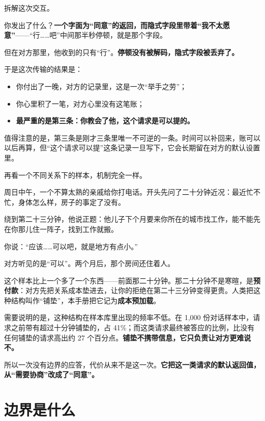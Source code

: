 拆解这次交互。

你发出了什么？\textbf{一个字面为“同意”的返回，而隐式字段里带着“我不太愿意”}——“行……吧”中间那半秒停顿，就是那个字段。

但在对方那里，他收到的只有“行”。\textbf{停顿没有被解码，隐式字段被丢弃了。}

于是这次传输的结果是：

\begin{itemize}
\item 你付出了一晚，对方的记录里，这是一次“举手之劳”；
\item 你心里积了一笔，对方心里没有这笔账；
\item \textbf{最严重的是第三条：你教会了他，这个请求是可以提的。}
\end{itemize}

值得注意的是，第三条是刚才三条里唯一不可逆的一条。时间可以补回来，账可以以后再算，但“这个请求可以提”这条记录一旦写下，它会长期留在对方的默认设置里。

再看一个不同关系下的样本，机制完全一样。

\par
\begin{mdquote}
周日中午，一个不算太熟的亲戚给你打电话。开头先问了二十分钟近况：最近忙不忙，身体怎么样，房子的事定了没有。\par
绕到第二十三分钟，他说正题：他儿子下个月要来你所在的城市找工作，能不能先在你那儿住一阵子，找到工作就搬。\par
你说：“应该……可以吧，就是地方有点小。”\par
\vspace{0.3\baselineskip}
对方听见的是“可以”。两个月后，那个房间还住着人。
\end{mdquote}

这个样本比上一个多了一个东西——前面那二十分钟。那二十分钟不是寒暄，是\textbf{预付款}：对方先把关系成本垫进去，让你的拒绝在第二十三分钟变得更贵。人类把这种结构叫作“铺垫”，本手册把它记为\textbf{成本预加载}。

需要说明的是，这种结构在样本库里出现的频率不低。在 1,000 份对话样本中，请求之前带有超过十分钟铺垫的，占 41\%；而这类请求最终被答应的比例，比没有任何铺垫的请求高出约 27 个百分点。\textbf{铺垫不携带信息，它只负责让对方更难说不。}

所以一次没有边界的应答，代价从来不是这一次。\textbf{它把这一类请求的默认返回值，从“需要协商”改成了“同意”。}

\section{边界是什么}

